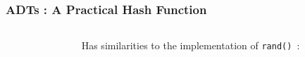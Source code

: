 
\begin{frame}[fragile]
\frametitle{ADTs : A Practical Hash Function}
\begin{columns}[T]

\begin{column}{0.45\textwidth}

\end{column}

\pause
\begin{column}{0.45\textwidth}
{\small
Has similarities to the implementation of \verb^rand()^~:
}

\end{column}

\end{columns}
\end{frame}



